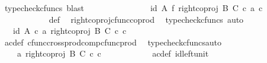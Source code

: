 \begin{isabellebody}
\ {\isacharparenleft}{\kern0pt}typecheck{\isacharunderscore}{\kern0pt}cfuncs{\isacharcomma}{\kern0pt}\ blast{\isacharparenright}{\kern0pt}\isanewline
\ \ \ \ \ \ \ \ \ \ \isamarkupfalse%
\ \isamarkupfalse%
\ {\isachardoublequoteopen}{\isachardot}{\kern0pt}{\isachardot}{\kern0pt}{\isachardot}{\kern0pt}\ {\isacharequal}{\kern0pt}\ {\isacharparenleft}{\kern0pt}id\ A\ {\isasymtimes}\isactrlsub f\ right{\isacharunderscore}{\kern0pt}coproj\ B\ C{\isacharparenright}{\kern0pt}\ {\isasymcirc}\isactrlsub c\ {\isasymlangle}a{\isacharprime}{\kern0pt}{\isacharcomma}{\kern0pt}\ c{\isacharprime}{\kern0pt}{\isasymrangle}{\isachardoublequoteclose}\isanewline
\ \ \ \ \ \ \ \ \ \ \isamarkupfalse%
\ {\isasymphi}{\isacharunderscore}{\kern0pt}def\ \isamarkupfalse%
\ right{\isacharunderscore}{\kern0pt}coproj{\isacharunderscore}{\kern0pt}cfunc{\isacharunderscore}{\kern0pt}coprod\ \isamarkupfalse%
\ {\isacharparenleft}{\kern0pt}typecheck{\isacharunderscore}{\kern0pt}cfuncs{\isacharcomma}{\kern0pt}\ auto{\isacharparenright}{\kern0pt}\isanewline
\ \ \ \ \ \ \ \ \isamarkupfalse%
\ \isamarkupfalse%
\ {\isachardoublequoteopen}{\isachardot}{\kern0pt}{\isachardot}{\kern0pt}{\isachardot}{\kern0pt}\ {\isacharequal}{\kern0pt}\ {\isasymlangle}id\ A\ {\isasymcirc}\isactrlsub c\ a{\isacharprime}{\kern0pt}{\isacharcomma}{\kern0pt}\ right{\isacharunderscore}{\kern0pt}coproj\ B\ C\ {\isasymcirc}\isactrlsub c\ c{\isacharprime}{\kern0pt}{\isasymrangle}{\isachardoublequoteclose}\isanewline
\ \ \ \ \ \ \ \ \ \ \isamarkupfalse%
\ a{\isacharprime}{\kern0pt}c{\isacharprime}{\kern0pt}{\isacharunderscore}{\kern0pt}def\ cfunc{\isacharunderscore}{\kern0pt}cross{\isacharunderscore}{\kern0pt}prod{\isacharunderscore}{\kern0pt}comp{\isacharunderscore}{\kern0pt}cfunc{\isacharunderscore}{\kern0pt}prod\ \isamarkupfalse%
\ {\isacharparenleft}{\kern0pt}typecheck{\isacharunderscore}{\kern0pt}cfuncs{\isacharcomma}{\kern0pt}auto{\isacharparenright}{\kern0pt}\isanewline
\ \ \ \ \ \ \ \ \isamarkupfalse%
\ \isamarkupfalse%
\ {\isachardoublequoteopen}{\isachardot}{\kern0pt}{\isachardot}{\kern0pt}{\isachardot}{\kern0pt}\ {\isacharequal}{\kern0pt}\ \ {\isasymlangle}a{\isacharprime}{\kern0pt}{\isacharcomma}{\kern0pt}\ right{\isacharunderscore}{\kern0pt}coproj\ B\ C\ {\isasymcirc}\isactrlsub c\ c{\isacharprime}{\kern0pt}{\isasymrangle}{\isachardoublequoteclose}\isanewline
\ \ \ \ \ \ \ \ \ \ \isamarkupfalse%
\ a{\isacharprime}{\kern0pt}c{\isacharprime}{\kern0pt}{\isacharunderscore}{\kern0pt}def\ id{\isacharunderscore}{\kern0pt}left{\isacharunderscore}{\kern0pt}unit{}\ \isamarkupfalse%

\end{isabellebody}

